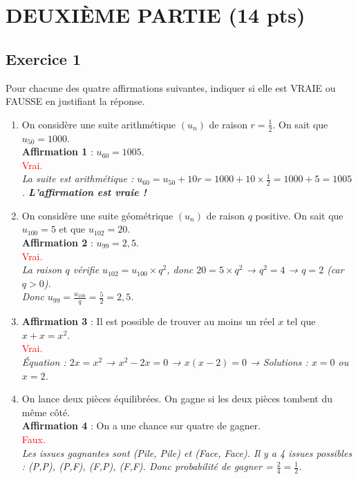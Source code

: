\documentclass[11pt,a4paper]{article}
\newcommand{\reponse}[1]{\textcolor{red}{#1}}
\begin{document}
\section*{DEUXIÈME PARTIE (14 pts)}

\subsection*{Exercice 1}
Pour chacune des quatre affirmations suivantes, indiquer si elle est VRAIE ou FAUSSE en justifiant la réponse.

\begin{enumerate}
    \item On considère une suite arithmétique $(u_n)$ de raison $r = \frac{1}{2}$. On sait que $u_{50} = 1000$. \\
    \textbf{Affirmation 1} : $u_{60} = 1005$. \\
    \reponse{Vrai.} \\
    \textit{La suite est arithmétique : $u_{60} = u_{50} + 10r = 1000 + 10 \times \frac{1}{2} = 1000 + 5 = 1005$. \textbf{L'affirmation est vraie !}}

    \item On considère une suite géométrique $(u_n)$ de raison $q$ positive. On sait que $u_{100} = 5$ et que $u_{102} = 20$. \\
    \textbf{Affirmation 2} : $u_{99} = 2,5$. \\
    \reponse{Vrai.} \\
    \textit{La raison $q$ vérifie $u_{102} = u_{100} \times q^2$, donc $20 = 5 \times q^2$ → $q^2 = 4$ → $q = 2$ (car $q > 0$). \\
    Donc $u_{99} = \frac{u_{100}}{q} = \frac{5}{2} = 2,5$.}

    \item \textbf{Affirmation 3} : Il est possible de trouver au moins un réel $x$ tel que $x + x = x^2$. \\
    \reponse{Vrai.} \\
    \textit{Équation : $2x = x^2$ → $x^2 - 2x = 0$ → $x(x - 2) = 0$ → Solutions : $x = 0$ ou $x = 2$.}

    \item On lance deux pièces équilibrées. On gagne si les deux pièces tombent du même côté. \\
    \textbf{Affirmation 4} : On a une chance sur quatre de gagner. \\
    \reponse{Faux.} \\
    \textit{Les issues gagnantes sont (Pile, Pile) et (Face, Face). Il y a 4 issues possibles : (P,P), (P,F), (F,P), (F,F). Donc probabilité de gagner = $\frac{2}{4} = \frac{1}{2}$.}
\end{enumerate}
\end{document}
